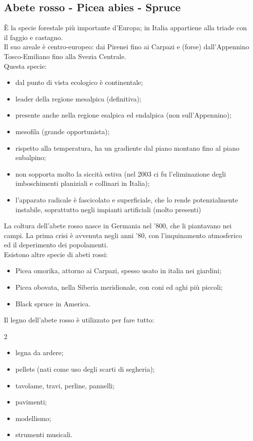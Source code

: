 \subsection{Abete rosso - Picea abies - Spruce}
È la specie forestale più importante d'Europa; in Italia appartiene alla triade con il faggio e castagno.\\
Il suo areale è centro-europeo: dai Pirenei fino ai Carpazi e (forse) dall'Appennino Tosco-Emiliano fino alla Svezia Centrale.\\
Questa specie:
\begin{itemize}[nosep]
    \item dal punto di vista ecologico è continentale;
    \item leader della regione mesalpica (definitiva);
    \item presente anche nella regione esalpica ed endalpica (non sull'Appennino);
    \item mesofila (grande opportunista);
    \item rispetto alla temperatura, ha un gradiente dal piano montano fino al piano subalpino;
    \item non sopporta molto la siccità estiva (nel 2003 ci fu l'eliminazione degli imboschimenti planiziali e collinari in Italia);
    \item l'apparato radicale è fascicolato e superficiale, che lo rende potenzialmente instabile, soprattutto negli impianti artificiali (molto presenti)
\end{itemize}
La coltura dell'abete rosso nasce in Germania nel '800, che li piantavano nei campi. La prima crisi è avvenuta negli anni '80, con l'inquinamento atmosferico ed il deperimento dei popolamenti.\\
Esistono altre specie di abeti rossi:
\begin{itemize}[nosep]
    \item Picea omorika, attorno ai Carpazi, spesso usato in italia nei giardini;
    \item Picea obovata, nella Siberia meridionale, con coni ed aghi più piccoli;
    \item Black spruce in America.
\end{itemize}
Il legno dell'abete rosso è utilizzato per fare tutto:
\begin{multicols}{2}
    \begin{itemize}[nosep]
        \item legna da ardere;
        \item pellets (nati come uso degli scarti di segheria);
        \item tavolame, travi, perline, pannelli;
        \item pavimenti;
        \item modellismo;
        \item strumenti musicali.
    \end{itemize}
\end{multicols}
